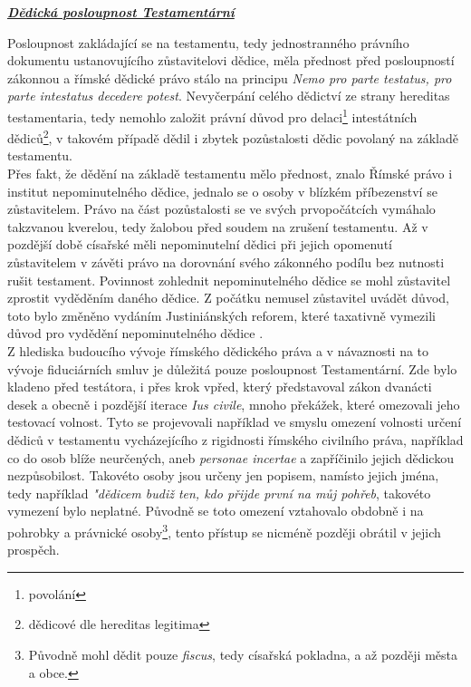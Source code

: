 \documentclass{article}
\begin{document}
\vspace{5 mm}


\underline{\textbf{\textit{Dědická posloupnost Testamentární}}}

\vspace*{5 mm}

Posloupnost zakládající se na testamentu, tedy jednostranného právního dokumentu ustanovujícího zůstavitelovi dědice, měla přednost před posloupností zákonnou a římské dědické právo stálo na principu \textit{Nemo pro parte testatus, pro parte intestatus decedere potest}. Nevyčerpání celého dědictví ze strany hereditas testamentaria, tedy nemohlo založit právní důvod pro delaci\footnote{povolání} intestátních dědiců\footnote{dědicové dle hereditas legitima}, v takovém případě dědil i zbytek pozůstalosti dědic povolaný na základě testamentu. \\

Přes fakt, že dědění na základě testamentu mělo přednost, znalo Římské právo i institut nepominutelného dědice, jednalo se o osoby v blízkém příbezenství se zůstavitelem. Právo na část pozůstalosti se ve svých prvopočátcích vymáhalo takzvanou kverelou, tedy žalobou před soudem na zrušení testamentu. Až v pozdější době císařské měli nepominutelní dědici při jejich opomenutí zůstavitelem v závěti právo na dorovnání svého zákonného podílu bez nutnosti rušit testament. Povinnost zohlednit nepominutelného dědice se mohl zůstavitel zprostit vyděděním daného dědice. Z počátku nemusel zůstavitel uvádět důvod, toto bylo změněno vydáním Justiniánských reforem, které taxativně vymezili důvod pro vydědění nepominutelného dědice  . \\

Z hlediska budoucího vývoje římského dědického práva a v návaznosti na to vývoje fiduciárních smluv je důležitá pouze posloupnost Testamentární. Zde bylo kladeno před testátora, i přes krok vpřed, který představoval zákon dvanácti desek a obecně i pozdější iterace \textit{Ius civile}, mnoho překážek, které omezovali jeho testovací volnost. Tyto se projevovali například ve smyslu omezení volnosti určení dědiců v testamentu vycházejícího z rigidnosti římského civilního práva, například co do osob blíže neurčených, aneb \textit{personae incertae} a zapříčinilo jejich dědickou nezpůsobilost. Takovéto osoby jsou určeny jen popisem, namísto jejich jména, tedy například \textit{"dědicem budiž ten, kdo přijde první na můj pohřeb}, takovéto vymezení bylo neplatné. Původně se toto omezení vztahovalo obdobně i na pohrobky a právnické osoby\footnote{Původně mohl dědit pouze \textit{fiscus}, tedy císařská pokladna, a až později města a obce.}, tento přístup se nicméně později obrátil v jejich prospěch.\\
\end{document}
